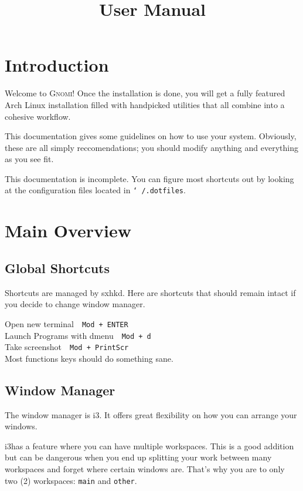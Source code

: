 \documentclass{article}
\author{\me}
\title{\sys User Manual}
\date{}
\newcommand{\ttt}[1]{\texttt{#1}}
\newcommand{\shortcut}[2]{#1~\dotfill{}~\ttt{#2}\\} %
\newcommand{\sys}{\textsc{Gnomi}\xspace}
\newcommand{\wm}{i3}
\newcommand{\shrtcm}{sxhkd}
\begin{document}
\maketitle
\tableofcontents

\section{Introduction}

Welcome to \sys!
Once the installation is done, you will get a fully featured Arch Linux installation filled with handpicked utilities that all combine into a cohesive workflow.

This documentation gives some guidelines on how to use your system.
Obviously, these are all simply reccomendations; you should modify anything and everything as you see fit.

This documentation is incomplete.
You can figure most shortcuts out 
by looking at the configuration files located in 
\ttt{\char`~/.dotfiles}.

\section{Main Overview}

\subsection{Global Shortcuts}

Shortcuts are managed by \shrtcm. Here are shortcuts that 
should remain intact if you decide to change window manager.

\begin{minipage}{\textwidth}

\shortcut{Open new terminal}{Mod + ENTER}
\shortcut{Launch Programs with dmenu}{Mod + d}
\shortcut{Take screenshot}{Mod + PrintScr}

Most functions keys should do something sane.

\end{minipage}


\subsection{Window Manager}

The window manager is \wm. It offers great flexibility on how you 
can arrange your windows. 

\wm has a feature where you can have multiple workspaces. 
This is a good addition but can be dangerous when you end 
up splitting your work between many workspaces and forget 
where certain windows are. 
That's why you are  to only two (2) workspaces: \ttt{main} and \ttt{other}.
\end{document}
